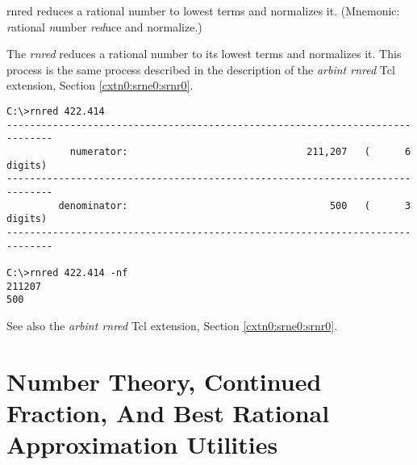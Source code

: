 \begin{dosutilcommandname}{rnred}%
reduces a rational number to lowest terms and normalizes it.
(Mnemonic:  \emph{r}ational
\emph{n}umber \emph{red}uce and normalize.)
\end{dosutilcommandname}

\begin{dosutilcommandsynopsis}
\end{dosutilcommandsynopsis}

\begin{dosutilcommanddescription}
The \emph{rnred} reduces a rational number to its lowest terms
and normalizes it.  This process is the same process
described in the description of the \emph{arbint rnred} Tcl
extension, Section \cxtnzeroxrefhyphen{}\ref{cxtn0:srne0:srnr0}.
\end{dosutilcommanddescription}

\begin{dosutilcommandsampleinvocations}
\begin{scriptsize}
\begin{verbatim}
C:\>rnred 422.414
------------------------------------------------------------------------------
           numerator:                               211,207   (      6 digits)
------------------------------------------------------------------------------
         denominator:                                   500   (      3 digits)
------------------------------------------------------------------------------

C:\>rnred 422.414 -nf
211207
500
\end{verbatim}
\end{scriptsize}
\end{dosutilcommandsampleinvocations}

\begin{dosutilcommandseealso}
See also the \emph{arbint rnred} Tcl extension, 
Section \cxtnzeroxrefhyphen{}\ref{cxtn0:srne0:srnr0}.
\end{dosutilcommandseealso}


\section[Number Theory, CF, And Approximation Utilities]
        {Number Theory, Continued Fraction, And Best Rational Approximation
         Utilities}
\label{cdcm0:snth0}


